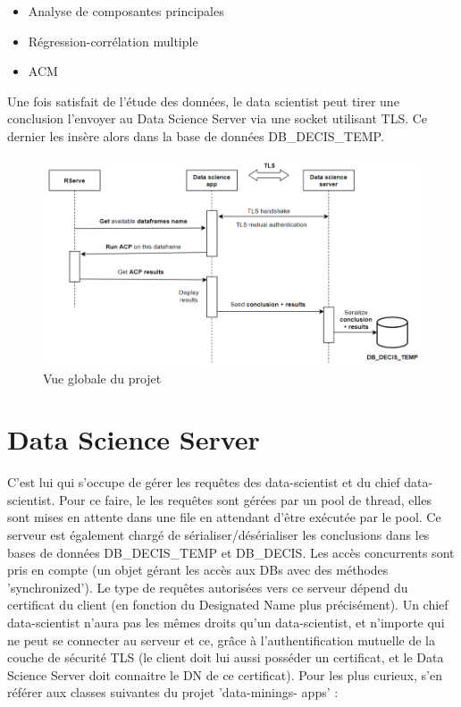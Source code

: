 \begin{itemize}
    \item Analyse de composantes principales
    \item Régression-corrélation multiple
    \item ACM
\end{itemize}

Une fois satisfait de l'étude des données, le data scientist peut tirer une conclusion l'envoyer au Data
Science Server via une socket utilisant TLS. Ce dernier les insère alors dans la base de données
DB\_DECIS\_TEMP.

\begin{figure}[H]
    \centering
    \includegraphics[width=\textwidth]{./img/thibault-DataScientistApp_1.png}
    \caption{Vue globale du projet}
    \label{fig:thibault-rserve-exchange}
\end{figure}

\section{Data Science Server}

C'est lui qui s'occupe de gérer les requêtes des data-scientist et du chief data-scientist. Pour ce faire, le
les requêtes sont gérées par un pool de thread, elles sont mises en attente dans une file en attendant
d'être exécutée par le pool.
Ce serveur est également chargé de sérialiser/désérialiser les conclusions dans les bases de données
DB\_DECIS\_TEMP et DB\_DECIS. Les accès concurrents sont pris en compte (un objet gérant les accès
aux DBs avec des méthodes 'synchronized').
Le type de requêtes autorisées vers ce serveur dépend du certificat du client (en fonction du Designated
Name plus précisément). Un chief data-scientist n'aura pas les mêmes droits qu'un data-scientist, et
n'importe qui ne peut se connecter au serveur et ce, grâce à l'authentification mutuelle de la couche
de sécurité TLS (le client doit lui aussi posséder un certificat, et le Data Science Server doit connaitre le
DN de ce certificat). Pour les plus curieux, s'en référer aux classes suivantes du projet 'data-minings-
apps' :

